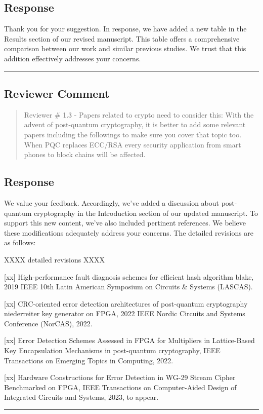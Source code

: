 \subsection{Response}
Thank you for your suggestion. In response, we have added a new table in the Results section of our revised manuscript. This table offers a comprehensive comparison between our work and similar previous studies. We trust that this addition effectively addresses your concerns.

\noindent\rule{\linewidth}{2.0pt}

\subsection{Reviewer Comment}
\begin{mdframed}
	\begin{quote}
		Reviewer \# 1.3 - Papers related to crypto need to consider this: With the advent of post-quantum cryptography, it is better to add some relevant papers including the followings to make sure you cover that topic too. When PQC replaces ECC/RSA every security application from smart phones to block chains will be affected.
	\end{quote}
\end{mdframed}

\subsection{Response}

We value your feedback. Accordingly, we've added a discussion about post-quantum cryptography in the Introduction section of our updated manuscript. To support this new content, we've also included pertinent references. We believe these modifications adequately address your concerns. The detailed revisions are as follows:


\color{blue}

XXXX detailed revisions XXXX


[xx] High-performance fault diagnosis schemes for efficient hash algorithm blake, 2019 IEEE 10th Latin American Symposium on Circuits \& Systems (LASCAS).

[xx] CRC-oriented error detection architectures of post-quantum cryptography niederreiter key generator on FPGA, 2022 IEEE Nordic Circuits and Systems Conference (NorCAS), 2022.

[xx] Error Detection Schemes Assessed in FPGA for Multipliers in Lattice-Based Key Encapsulation Mechanisms in post-quantum cryptography, IEEE Transactions on Emerging Topics in Computing, 2022.

[xx] Hardware Constructions for Error Detection in WG-29 Stream Cipher Benchmarked on FPGA, IEEE Transactions on Computer-Aided Design of Integrated Circuits and Systems, 2023, to appear.

\color{black}

\noindent\rule{\linewidth}{6.0pt}